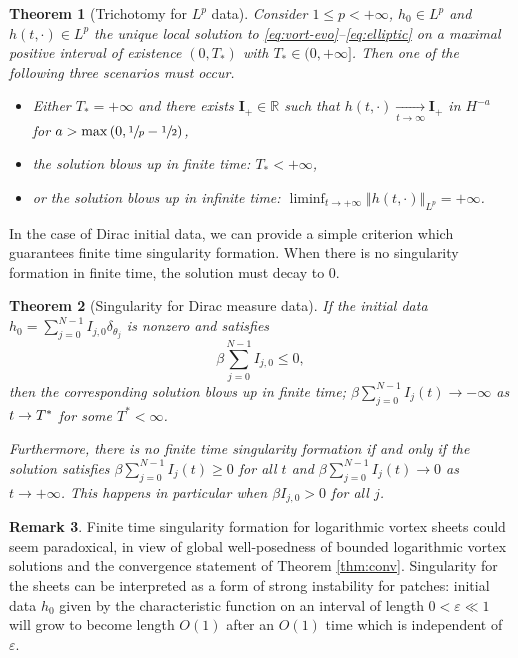 \documentclass[JEP,XML,SOM,Unicode,NoFloatCountersInSection,published]{cedram}
\theoremstyle{plain}
\newtheorem{theorem}{Theorem}[section]
\theoremstyle{definition}
\newtheorem{remark}[theorem]{Remark}
\let\bt\beta
\let\dlt\delta
\let\tht\theta
\let\varep\varepsilon
\newcommand{\bfI}{{\mathbf I}}
\begin{document}
\begin{theorem}[Trichotomy for $L^p$ data] \label{thm:tri}
Consider $1\leq p<+\infty$, $h_0\in L^p$ and $h(t,\cdot)\in L^p$ the unique local solution to \eqref{eq:vort-evo}--\eqref{eq:elliptic} on a maximal positive interval of existence $(0,T_*)$ with $T_*\in (0,+\infty]$. Then one of the following three scenarios must occur.
\begin{itemize}
\item Either $T_*=+\infty$ and there exists $\bfI_+\in \mathbb{R}$ such that $h(t,\cdot)\underset{t\to \infty}{\to} \bfI_+$ in $H^{-a}$ for $a>\max\left(0,\sfrac{1}{p}-\sfrac{1}{2}\right)$,
\item the solution blows up in finite time: $T_*<+\infty$,
\item or the solution blows up in infinite time: $\liminf_{t\to +\infty}\left\Vert h(t,\cdot)\right\Vert_{L^p}=+\infty$.
\end{itemize}
\end{theorem}

In the case of Dirac initial data, we can provide a simple criterion which guarantees finite time singularity formation. When there is no singularity formation in finite time, the solution must decay to 0.

\begin{theorem}[Singularity for Dirac measure data] \label{thm:blowup-Dirac}
If the initial data $h_0 = \sum_{j=0}^{N-1} I_{j,0} \dlt_{\tht_j}$ is nonzero and satisfies
\[
\bt \sum_{j=0}^{N-1} I_{j,0} \le 0,
\]
then the corresponding solution blows up in finite time; $\bt \sum_{j=0}^{N-1} I_j(t) \to -\infty$ as $t\to\nobreak T^*$ for some $T^*<\infty$.

Furthermore, there is no finite time singularity formation if and only if the solution satisfies $\bt \sum_{j=0}^{N-1} I_j(t) \geq 0$ for all $t$ and $\bt \sum_{j=0}^{N-1} I_j(t) \to 0$ as $t\to +\infty$. This happens in particular when $\bt I_{j,0} > 0$ for all $j$.
\end{theorem}

\begin{remark}
Finite time singularity formation for logarithmic vortex sheets could seem paradoxical, in view of global well-posedness of bounded logarithmic vortex solutions and the convergence statement of Theorem \ref{thm:conv}. Singularity for the sheets can be interpreted as a form of strong instability for patches: initial data $h_{0}$ given by the characteristic function on an interval of length $0<\varep\ll 1$ will grow to become length $O(1)$ after an $O(1)$ time which is independent of $\varep$.
\end{remark}
\end{document}
